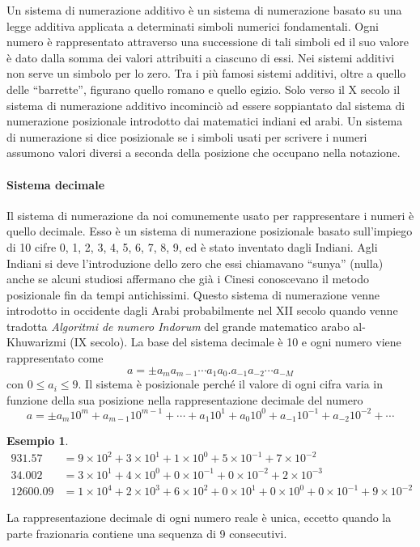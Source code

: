 \documentclass{article}
\theoremstyle{plain}
\theoremstyle{definition}
\newtheorem{exmp}{Esempio}[section]
\theoremstyle{remark}
\begin{document}
Un sistema di numerazione additivo è un sistema di numerazione basato su una legge additiva applicata a determinati simboli numerici fondamentali. Ogni numero è rappresentato attraverso una successione di tali simboli ed il suo valore è dato dalla somma dei valori attribuiti a ciascuno di essi. Nei sistemi additivi non serve un simbolo per lo zero.
Tra i più famosi sistemi additivi, oltre a quello delle “barrette”, figurano quello romano e quello egizio.
Solo verso il X secolo il sistema di numerazione additivo incominciò ad essere soppiantato dal sistema di numerazione posizionale introdotto dai matematici indiani ed arabi.
Un sistema di numerazione si dice posizionale se i simboli usati per scrivere i numeri assumono valori diversi a seconda della posizione che occupano nella notazione.

\paragraph{Sistema decimale}
Il sistema di numerazione da noi comunemente usato per rappresentare i numeri è quello decimale.
Esso è un sistema di numerazione posizionale basato sull'impiego di 10 cifre 0, 1, 2, 3, 4, 5, 6, 7, 8, 9, ed è stato inventato dagli Indiani.
Agli Indiani si deve l'introduzione dello zero che essi chiamavano “sunya” (nulla) anche se alcuni studiosi affermano che già i Cinesi conoscevano il metodo posizionale fin da tempi antichissimi.
Questo sistema di numerazione venne introdotto in occidente dagli Arabi probabilmente nel XII secolo quando venne tradotta \textit{Algoritmi de numero Indorum} del grande matematico arabo al-Khuwarizmi (IX secolo).
La base del sistema decimale è 10 e ogni numero viene rappresentato come
\[ a = \pm a_m a_{m-1} \cdots a_1 a_0.a_{-1} a_{-2} \cdots a_{-M} \]
con \(0 \leq a_i \leq 9\).
Il sistema è posizionale perché il valore di ogni cifra varia in funzione della sua posizione nella rappresentazione decimale del numero
\[ a = \pm a_m 10^m + a_{m-1} 10^{m-1} + \cdots + a_1 10^1 + a_0 10^0 + a_{-1} 10^{-1} + a_{-2} 10^{-2} + \cdots \]
\begin{exmp}
\[
\begin{aligned}
    931.57 & = 9 \times 10^2 + 3 \times 10^1 + 1 \times 10^0 + 5 \times 10^{-1} + 7 \times 10^{-2} \\
    34.002 & = 3 \times 10^1 + 4 \times 10^0 + 0 \times 10^{-1} + 0 \times 10^{-2} + 2 \times 10^{-3} \\
    12600.09 & = 1 \times 10^4 + 2 \times 10^3 + 6 \times 10^2 + 0 \times 10^1 + 0 \times 10^0 + 0 \times 10^{-1} + 9 \times 10^{-2}
\end{aligned}
\]
\end{exmp}
La rappresentazione decimale di ogni numero reale è unica, eccetto quando la parte frazionaria contiene una sequenza di 9 consecutivi. 
\end{document}
